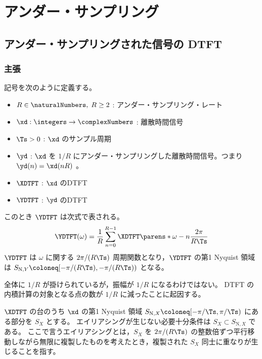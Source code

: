 \chapter{アンダー・サンプリング}
    \section{アンダー・サンプリングされた信号の DTFT}
        \label{アンダー・サンプリングされた信号の DTFT}
        \subsection{主張}
            記号を次のように定義する。
            \begin{itemize}
                \item $R\in\naturalNumbers,\;R\geq 2$ : アンダー・サンプリング・レート
                \item $\xd:\integers\to\complexNumbers$ : 離散時間信号
                \item $\Ts>0$ : $\xd$ のサンプル周期
                \item $\yd$ : $\xd$ を $1/R$ にアンダー・サンプリングした離散時間信号。つまり $\yd(n) = \xd(nR)$ 。
                \item $\XDTFT$ : $\xd$ のDTFT
                \item $\YDTFT$ : $\yd$ のDTFT
            \end{itemize}
            このとき $\YDTFT$ は次式で表される。
            \[ \YDTFT(\omega) = \frac{1}{R}\sum_{n=0}^{R-1} \XDTFT\parens*{\omega-n\frac{2\pi}{R\Ts}} \]
            $\YDTFT$ は $\omega$ に関する $2\pi/(R\Ts)$ 周期関数となり，$\YDTFT$ の第1 Nyquist 領域は $S_{\text{N},Y} \coloneq [-\pi/(R\Ts),-\pi/(R\Ts))$ となる。
            \par
            全体に $1/R$ が掛けられているが，振幅が $1/R$ になるわけではない。
            DTFT の内積計算の対象となる点の数が $1/R$ に減ったことに起因する。
            \par
            $\XDTFT$ の台のうち $\xd$ の第1 Nyquist 領域 $S_{\text{N},X} \coloneq [-\pi/\Ts, \pi/\Ts)$ にある部分を $S_X$ とする。
            エイリアシングが生じない必要十分条件は $S_X\subset S_{\text{N},X}$ である。
            ここで言うエイリアシングとは，$S_X$ を $2\pi/(R\Ts)$ の整数倍ずつ平行移動しながら無限に複製したものを考えたとき，複製された $S_X$ 同士に重なりが生じることを指す。
